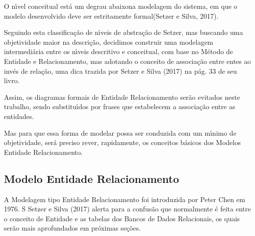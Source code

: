 \documentclass[
12pt,		%
openright,	%
twoside,  %
a4paper,			%
chapter=TITLE,		%
english,			%
french,				%
spanish,			%
brazil				%
]{USPSC-classe/USPSC_RedarTex}
\begin{document}
\noindent\begin{center}\mbox{\centering{}}\end{center}


O n\'{\i}vel conceitual est\'a \textquotedbl um degrau abaixo\textquotedbl  na modelagem do sistema, em que \textquotedbl o modelo desenvolvido deve ser estritamente formal\textquotedbl  (Setzer e Silva, 2017).








Seguindo esta classifica\c{c}\~ao de n\'{\i}veis de abstra\c{c}\~ao de Setzer, mas buscando uma objetividade maior na descri\c{c}\~ao, decidimos construir uma modelagem intermedi\'aria entre os n\'{\i}veis descritivo e conceitual, com base no M\'etodo de Entidade e Relacionamento, mas adotando o conceito de associa\c{c}\~ao entre entes ao inv\'es de rela\c{c}\~ao, uma dica trazida por  Setzer e Silva (2017) na p\'ag. 33 de seu livro.








Assim, os diagramas formais de Entidade Relacionamento ser\~ao evitados neste trabalho, sendo substitu\'{\i}dos por frases que estabelecem a associa\c{c}\~ao entre as entidades.








Mas para que essa forma de modelar possa ser conduzida com um m\'{\i}nimo de objetividade, ser\'a preciso rever, rapidamente, os conceitos b\'asicos dos Modelos Entidade Relacionamento.








\subsection[Modelo Entidade Relacionamento]{Modelo Entidade Relacionamento}\label{Modelo Entidade Relacionamento}
A Modelagem tipo Entidade Relacionamento foi introduzida por Peter Chen em 1976. S Setzer e Silva (2017) alerta para a confus\~ao que normalmente \'e feita entre o conceito de Entidade e as tabelas dos Bancos de Dados Relacionais, os quais ser\~ao mais aprofundados em pr\'oximas se\c{c}\~oes.
\end{document}
